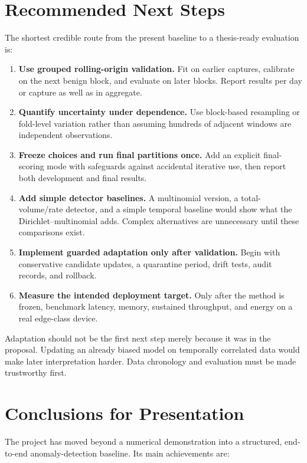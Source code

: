 \documentclass[11pt,a4paper]{article}
\begin{document}
\section{Recommended Next Steps}

The shortest credible route from the present baseline to a thesis-ready evaluation is:

\begin{enumerate}
  \item \textbf{Use grouped rolling-origin validation.} Fit on earlier captures, calibrate on the next benign block, and evaluate on later blocks. Report results per day or capture as well as in aggregate.
  \item \textbf{Quantify uncertainty under dependence.} Use block-based resampling or fold-level variation rather than assuming hundreds of adjacent windows are independent observations.
  \item \textbf{Freeze choices and run final partitions once.} Add an explicit final-scoring mode with safeguards against accidental iterative use, then report both development and final results.
  \item \textbf{Add simple detector baselines.} A multinomial version, a total-volume/rate detector, and a simple temporal baseline would show what the Dirichlet--multinomial adds. Complex alternatives are unnecessary until these comparisons exist.
  \item \textbf{Implement guarded adaptation only after validation.} Begin with conservative candidate updates, a quarantine period, drift tests, audit records, and rollback.
  \item \textbf{Measure the intended deployment target.} Only after the method is frozen, benchmark latency, memory, sustained throughput, and energy on a real edge-class device.
\end{enumerate}

Adaptation should not be the first next step merely because it was in the proposal. Updating an already biased model on temporally correlated data would make later interpretation harder. Data chronology and evaluation must be made trustworthy first.

\section{Conclusions for Presentation}

The project has moved beyond a numerical demonstration into a structured, end-to-end anomaly-detection baseline. Its main achievements are:
\end{document}
